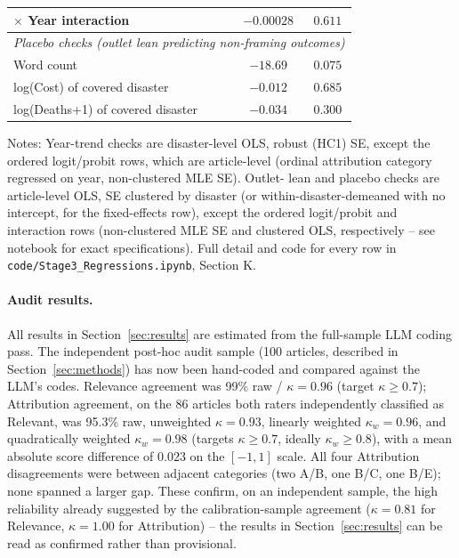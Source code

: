 \documentclass[12pt]{article}
\begin{document}
\begin{table}[ht]
\begin{threeparttable}
\begin{tabular}{lcc}
\quad $\times$ Year interaction             & $-0.00028$  & $0.611$ \\
\midrule
\multicolumn{3}{l}{\emph{Placebo checks (outlet lean predicting non-framing outcomes)}} \\
\quad Word count                            & $-18.69$    & $0.075$ \\
\quad log(Cost) of covered disaster          & $-0.012$    & $0.685$ \\
\quad log(Deaths+1) of covered disaster      & $-0.034$    & $0.300$ \\
\bottomrule
\end{tabular}
\begin{tablenotes}
\small
\item Notes: Year-trend checks are disaster-level OLS, robust (HC1) SE,
except the ordered logit/probit rows, which are article-level (ordinal
attribution category regressed on year, non-clustered MLE SE). Outlet-
lean and placebo checks are article-level OLS, SE clustered by disaster
(or within-disaster-demeaned with no intercept, for the fixed-effects
row), except the ordered logit/probit and interaction rows (non-clustered
MLE SE and clustered OLS, respectively -- see notebook for exact
specifications). Full detail and code for every row in
\texttt{code/Stage3\_Regressions.ipynb}, Section K.
\end{tablenotes}
\end{threeparttable}
\end{table}

\paragraph{Audit results.} All results in Section~\ref{sec:results} are
estimated from the full-sample LLM coding pass. The independent post-hoc
audit sample (100 articles, described in Section~\ref{sec:methods}) has
now been hand-coded and compared against the LLM's codes. Relevance
agreement was 99\% raw / $\kappa = 0.96$ (target $\kappa \geq 0.7$);
Attribution agreement, on the 86 articles both raters independently
classified as Relevant, was 95.3\% raw, unweighted $\kappa = 0.93$,
linearly weighted $\kappa_w = 0.96$, and quadratically weighted
$\kappa_w = 0.98$ (targets $\kappa \geq 0.7$, ideally $\kappa_w \geq 0.8$),
with a mean absolute score difference of $0.023$ on the $[-1,1]$ scale.
All four Attribution disagreements were between adjacent categories (two
A/B, one B/C, one B/E); none spanned a larger gap. These confirm, on an
independent sample, the high reliability already suggested by the
calibration-sample agreement ($\kappa=0.81$ for Relevance, $\kappa=1.00$
for Attribution) -- the results in Section~\ref{sec:results} can be read
as confirmed rather than provisional.
\end{document}
